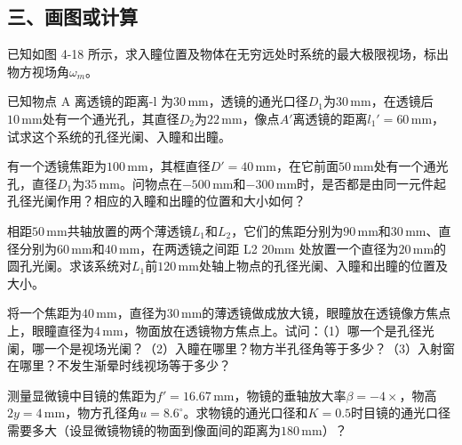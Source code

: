 \documentclass[standard, analysis, notocnum]{ExBook}
\newcommand{\answerarea}[1][8cm]{%
  \par\vspace{2mm}%
  \noindent{\color{themeColor!35}\rule{\linewidth}{0.4pt}}\par
  \noindent\begin{minipage}[t][#1][t]{\linewidth}\vspace{0pt}\end{minipage}\par
  \noindent{\color{themeColor!35}\rule{\linewidth}{0.4pt}}\par
}
\begin{document}
\subsection{三、画图或计算}
\begin{qitems}[startnum=1]
\qitem 已知如图 4-18 所示，求入瞳位置及物体在无穷远处时系统的最大极限视场，标出物方视场角$\omega_{m}$。
\label{q:81:start}
\answerarea[8cm]
\label{q:81:end}
\end{qitems}

\begin{qitems}[startnum=2]
\qitem 已知物点 A 离透镜的距离-l 为$30\,\mathrm{mm}$，透镜的通光口径$D_{1}$为$30\,\mathrm{mm}$，在透镜后$10\,\mathrm{mm}$处有一个通光孔，其直径$D_{2}$为$22\,\mathrm{mm}$，像点$A'$离透镜的距离$l_{1}'=60\,\mathrm{mm}$，试求这个系统的孔径光阑、入瞳和出瞳。
\label{q:82:start}
\answerarea[8cm]
\label{q:82:end}
\end{qitems}

\begin{qitems}[startnum=3]
\qitem 有一个透镜焦距为$100\,\mathrm{mm}$，其框直径$D'=40\,\mathrm{mm}$，在它前面$50\,\mathrm{mm}$处有一个通光孔，直径$D_{1}$为$35\,\mathrm{mm}$。问物点在$-500\,\mathrm{mm}$和$-300\,\mathrm{mm}$时，是否都是由同一元件起孔径光阑作用？相应的入瞳和出瞳的位置和大小如何？
\label{q:83:start}
\answerarea[8cm]
\label{q:83:end}
\end{qitems}

\begin{qitems}[startnum=4]
\qitem 相距$50\,\mathrm{mm}$共轴放置的两个薄透镜$L_{1}$和$L_{2}$，它们的焦距分别为$90\,\mathrm{mm}$和$30\,\mathrm{mm}$、直径分别为$60\,\mathrm{mm}$和$40\,\mathrm{mm}$，在两透镜之间距 L2 20mm 处放置一个直径为$20\,\mathrm{mm}$的圆孔光阑。求该系统对$L_{1}$前$120\,\mathrm{mm}$处轴上物点的孔径光阑、入瞳和出瞳的位置及大小。
\label{q:84:start}
\answerarea[8cm]
\label{q:84:end}
\end{qitems}

\begin{qitems}[startnum=5]
\qitem 将一个焦距为$40\,\mathrm{mm}$，直径为$30\,\mathrm{mm}$的薄透镜做成放大镜，眼瞳放在透镜像方焦点上，眼瞳直径为$4\,\mathrm{mm}$，物面放在透镜物方焦点上。试问：（1）哪一个是孔径光阑，哪一个是视场光阑？（2）入瞳在哪里？物方半孔径角等于多少？（3）入射窗在哪里？不发生渐晕时线视场等于多少？
\label{q:85:start}
\answerarea[8cm]
\label{q:85:end}
\end{qitems}

\begin{qitems}[startnum=6]
\qitem 测量显微镜中目镜的焦距为$f'=16.67\,\mathrm{mm}$，物镜的垂轴放大率$\beta =-4\times$，物高$2y=4\,\mathrm{mm}$，物方孔径角$u=8.6^{\circ}$。求物镜的通光口径和$K=0.5$时目镜的通光口径需要多大（设显微镜物镜的物面到像面间的距离为$180\,\mathrm{mm}$）？
\label{q:86:start}
\answerarea[8cm]
\label{q:86:end}
\end{qitems}
\end{document}
